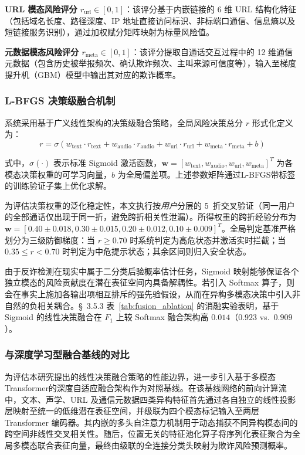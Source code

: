 \documentclass[11pt, a4paper]{article}
\begin{document}
\textbf{URL 模态风险评分 $r_{\mathrm{url}} \in [0,1]$}：该评分基于内嵌链接的 6 维 URL 结构化特征（包括域名长度、路径深度、IP 地址直接访问标识、非标端口通信、信息熵以及短链接服务识别），通过加权赋分矩阵映射为标量风险值。
    
\textbf{元数据模态风险评分 $r_{\mathrm{meta}} \in [0,1]$}：该评分提取自通话交互过程中的 12 维通信元数据（包含历史被举报频次、确认欺诈频次、主叫来源可信度等），输入至梯度提升机（GBM）模型中输出其对应的欺诈概率。


\subsubsection{L-BFGS 决策级融合机制}
系统采用基于广义线性架构的决策级融合策略，全局风险决策总分 $r$ 形式化定义为：
\begin{equation}
\label{eq:l_bfgs_fusion}
    r = \sigma\left( w_{\mathrm{text}} \cdot r_{\mathrm{text}} + w_{\mathrm{audio}} \cdot r_{\mathrm{audio}} + w_{\mathrm{url}} \cdot r_{\mathrm{url}} + w_{\mathrm{meta}} \cdot r_{\mathrm{meta}} + b \right)
\end{equation}

式中，$\sigma(\cdot)$ 表示标准 Sigmoid 激活函数，$\mathbf{w} = [w_{\mathrm{text}}, w_{\mathrm{audio}}, w_{\mathrm{url}}, w_{\mathrm{meta}}]^T$ 为各模态决策权重的可学习向量，$b$ 为全局偏差项。上述参数矩阵通过L-BFGS带标签的训练验证子集上优化求解。

为评估决策权重的泛化稳定性，本文执行按\emph{用户}分层的 5~折交叉验证（同一用户的全部通话仅出现于同一折，避免跨折相关性泄漏）。所得权重的跨折经验分布为 $\mathbf{w} = [0.40 \pm 0.018, 0.30 \pm 0.015, 0.20 \pm 0.012, 0.10 \pm 0.009]^T$。全局判定基准严格划分为三级防御梯度：当 $r \ge 0.70$ 时系统判定为高危状态并激活实时拦截；当 $0.35 \le r < 0.70$ 时判定为中危提示状态；其余区间则归入安全状态。

由于反诈检测在现实中属于二分类后验概率估计任务，Sigmoid 映射能够保证各个独立模态的风险贡献度在潜在表征空间内具备解耦性。若引入 Softmax 算子，则会在事实上施加各输出项相互排斥的强先验假设，从而在异构多模态决策中引入非自然的负相关耦合。\S~3.5.3 表~\ref{tab:fusion_ablation} 的消融实验表明，基于 Sigmoid 的线性决策融合在 $F_1$ 上较 Softmax 融合架构高 $0.014$（$0.923$ vs.\ $0.909$）。

\subsubsection{与深度学习型融合基线的对比}

为评估本研究提出的线性决策融合策略的性能边界，进一步引入基于多模态 Transformer的深度自适应融合架构作为对照基线。在该基线网络的前向计算流中，文本、声学、URL 及通信元数据四类异构特征首先通过各自独立的线性投影层映射至统一的低维潜在表征空间，并级联为四个模态标记输入至两层 Transformer 编码器。其内嵌的多头自注意力机制用于动态捕获不同异构模态间的跨空间非线性交叉相关性。随后，位置无关的特征池化算子将序列化表征聚合为全局多模态联合表征向量，最终由级联的全连接分类头映射为欺诈风险预测概率。
\end{document}
